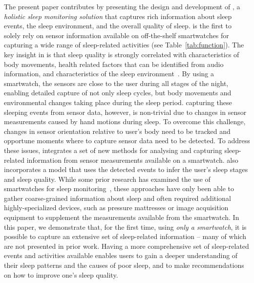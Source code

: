 The present paper contributes by presenting the design and development of \systemname, a \emph{holistic sleep monitoring solution} that captures rich information about sleep events, the sleep environment, and the overall quality of sleep. \systemname is the first to solely rely on sensor information available on off-the-shelf smartwatches for capturing a wide range of sleep-related activities (see Table~\ref{tab:function}). The key insight in {\systemname} is that sleep quality is strongly correlated with characteristics of body movements, health related factors that can be identified from audio information, and characteristics of the sleep environment~\cite{shelgikar2016sleep}. By using a smartwatch, the sensors are close to the user during all stages of the night, enabling detailed capture of not only sleep cycles, but body movements and environmental changes taking place during the sleep period. capturing these sleeping events from sensor data, however, is non-trivial due to changes in sensor measurements caused by hand motions during sleep. To overcome this challenge, changes in sensor orientation relative to user's body need to be tracked and opportune moments where to capture sensor data need to be detected. To address these issues, \systemname integrates a set of new methods for analysing and capturing sleep-related information from sensor measurements available on a smartwatch. \systemname also incorporates a model that uses the detected events to infer the user's sleep stages and sleep quality. While some prior research has examined the use of smartwatches for sleep monitoring~\cite{pombo2016ubisleep,shelgikar2016sleep,haescher2015anomaly,borazio2012combining}, these approaches have only been able to gather coarse-grained information about sleep and often required additional highly-specialized devices, such as pressure mattresses or image acquisition equipment to supplement the measurements available from the smartwatch. In this paper, we demonstrate that, for the first time, using {\em only a smartwatch}, it is possible to capture an extensive set of sleep-related information -- many of which are not presented in prior work. Having a more comprehensive set of sleep-related events and activities available enables users to gain a deeper understanding of their sleep patterns and the causes of poor sleep, and to make recommendations on how to improve one's sleep quality. 




